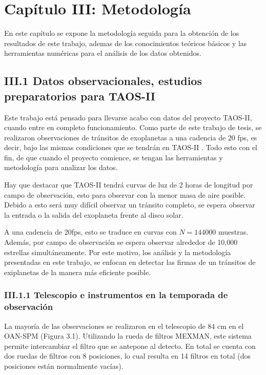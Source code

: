 \chapter*{\textbf{Capítulo III: Metodología}}
\setcounter{chapter}{3}

En este capítulo se expone la metodología seguida para la obtención de los resultados de este trabajo, ademas de los conocimientos teóricos básicos y las herramientas numéricas para el análisis de los datos obtenidos.


\section*{III.1 Datos observacionales, estudios preparatorios para TAOS-II}

Este trabajo está pensado para llevarse acabo con datos del proyecto TAOS-II, cuando entre en completo funcionamiento. Como parte de este trabajo de tesis, se realizaron observaciones de tránsitos de exoplanetas a una cadencia de 20 fps, es decir, bajo las mismas condiciones que se tendrán en TAOS-II \cite{lehner2012transneptunian}. Todo esto con el fin, de que cuando el proyecto comience, se tengan las herramientas y metodología para analizar los datos.

Hay que destacar que TAOS-II tendrá curvas de luz de 2 horas de longitud por campo de observación, esto para observar con la menor masa de aire posible. Debido a esto será muy difícil observar un tránsito completo, se espera observar la entrada o la salida del exoplaneta frente al disco solar. 

A una cadencia de 20fps, esto se traduce en curvas con $N=144000$ muestras. Además, por campo de observación se espera observar alrededor de 10,000 estrellas simultáneamente. Por este motivo, los análisis y la metodología presentadas en este trabajo, se enfocan en detectar las firmas de un tránsitos de exiplanetas de la manera más eficiente posible.

\subsection*{III.1.1 Telescopio e instrumentos en la temporada de observación}

La mayoría de las observaciones se realizaron en el telescopio de 84 cm en el OAN-SPM (Figura 3.1). Utilizando la rueda de filtros MEXMAN, este sistema permite intercambiar el filtro que se antepone al detecto. En total se cuenta con dos ruedas de filtros con 8 posiciones, lo cual resulta en 14 filtros en total (dos posiciones están normalmente vacías). 

